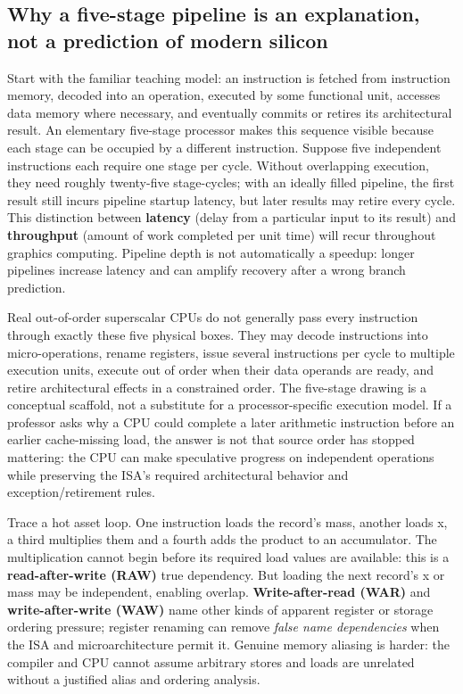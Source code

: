\subsection{Why a five-stage pipeline is an explanation, not a prediction of modern silicon}\label{01-foundations-i-ch007-why-a-five-stage-pipeline-is-an-explanation-not-a-prediction-of-modern-silicon}

Start with the familiar teaching model: an instruction is fetched from instruction memory, decoded into an operation, executed by some functional unit, accesses data memory where necessary, and eventually commits or retires its architectural result. An elementary five-stage processor makes this sequence visible because each stage can be occupied by a different instruction. Suppose five independent instructions each require one stage per cycle. Without overlapping execution, they need roughly twenty-five stage-cycles; with an ideally filled pipeline, the first result still incurs pipeline startup latency, but later results may retire every cycle. This distinction between \textbf{latency} (delay from a particular input to its result) and \textbf{throughput} (amount of work completed per unit time) will recur throughout graphics computing. Pipeline depth is not automatically a speedup: longer pipelines increase latency and can amplify recovery after a wrong branch prediction.

Real out-of-order superscalar CPUs do not generally pass every instruction through exactly these five physical boxes. They may decode instructions into micro-operations, rename registers, issue several instructions per cycle to multiple execution units, execute out of order when their data operands are ready, and retire architectural effects in a constrained order. The five-stage drawing is a conceptual scaffold, not a substitute for a processor-specific execution model. If a professor asks why a CPU could complete a later arithmetic instruction before an earlier cache-missing load, the answer is not that source order has stopped mattering: the CPU can make speculative progress on independent operations while preserving the ISA's required architectural behavior and exception/retirement rules.

Trace a hot asset loop. One instruction loads the record's mass, another loads x, a third multiplies them and a fourth adds the product to an accumulator. The multiplication cannot begin before its required load values are available: this is a \textbf{read-after-write (RAW)} true dependency. But loading the next record's x or mass may be independent, enabling overlap. \textbf{Write-after-read (WAR)} and \textbf{write-after-write (WAW)} name other kinds of apparent register or storage ordering pressure; register renaming can remove \emph{false name dependencies} when the ISA and microarchitecture permit it. Genuine memory aliasing is harder: the compiler and CPU cannot assume arbitrary stores and loads are unrelated without a justified alias and ordering analysis.

